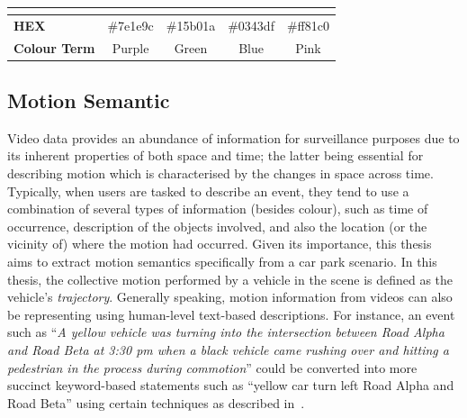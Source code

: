 \begin{table}[!ht]
\begin{tabular}{lcccc}
\multicolumn{1}{l|}{}                     & \multicolumn{1}{l|}{\cellcolor[HTML]{7E1E9C}} & \multicolumn{1}{l|}{\cellcolor[HTML]{15B01A}} & \multicolumn{1}{l|}{\cellcolor[HTML]{0343DF}} & \multicolumn{1}{l|}{\cellcolor[HTML]{FF81C0}} \\ \hline
\multicolumn{1}{|l|}{\textbf{HEX}}        & \multicolumn{1}{c|}{\#7e1e9c}                 & \multicolumn{1}{c|}{\#15b01a}                 & \multicolumn{1}{c|}{\#0343df}                 & \multicolumn{1}{c|}{\#ff81c0}                 \\ \hline
\multicolumn{1}{|l|}{\textbf{Colour Term}}  & \multicolumn{1}{c|}{Purple}                   & \multicolumn{1}{c|}{Green}                    & \multicolumn{1}{c|}{Blue}                     & \multicolumn{1}{c|}{Pink}                     \\ \hline
\end{tabular}
\label{table:colorshex}
\end{table}



\vspace{1em}
\subsection{Motion Semantic}

Video data provides an abundance of information for surveillance purposes due to its inherent properties of both space and time; the latter being essential for describing motion which is characterised by the changes in space across time.
Typically, when users are tasked to describe an event, they tend to use a combination of several types of information (besides colour), such as time of occurrence, description of the objects involved, and also the location (or the vicinity of) where the motion had occurred.
Given its importance, this thesis aims to extract motion semantics specifically from a car park scenario.
In this thesis, the collective motion performed by a vehicle in the scene is defined as the vehicle's \emph{trajectory}.
Generally speaking, motion information from videos can also be representing using human-level text-based descriptions. For instance, an event such as ``\textit{A yellow vehicle was turning into the intersection between Road Alpha and Road Beta at 3:30 pm when a black vehicle came rushing over and hitting a pedestrian in the process during commotion}'' could be converted into more succinct keyword-based statements such as ``yellow car turn left Road Alpha and Road Beta'' using certain techniques as described in~\cite{feris2012large,momin2015vehicle,yang2015semantic}.

